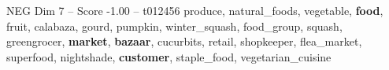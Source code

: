 \begin{textsample}{NEG Dim 7 – Score -1.00 – t012456}  \label{ex:f7_neg_029}
produce, natural\_foods, vegetable, \textbf{food}, fruit, calabaza, gourd, pumpkin, winter\_squash, food\_group, squash, greengrocer, \textbf{market}, \textbf{bazaar}, cucurbits, retail, shopkeeper, flea\_market, superfood, nightshade, \textbf{customer}, staple\_food, vegetarian\_cuisine

\end{textsample}
